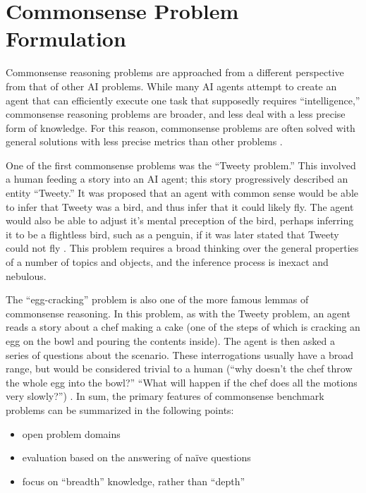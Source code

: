 \section{Commonsense Problem Formulation}
Commonsense reasoning problems are approached from a different perspective from that of other AI problems. While many AI agents attempt to create an agent that can efficiently execute one task that supposedly requires ``intelligence,'' commonsense reasoning problems are broader, and less deal with a less precise form of knowledge. For this reason, commonsense problems are often solved with general solutions with less precise metrics than other problems \cite{johnston2008comirit,johnston2009practical}.

One of the first commonsense problems was the ``Tweety problem.'' This involved a human feeding a story into an AI agent; this story progressively described an entity ``Tweety.'' It was proposed that an agent with common sense would be able to infer that Tweety was a bird, and thus infer that it could likely fly. The agent would also be able to adjust it's mental preception of the bird, perhaps inferring it to be a flightless bird, such as a penguin, if it was later stated that Tweety could not fly \cite{johnston2008comirit,egg-cracking}. This problem requires a broad thinking over the general properties of a number of topics and objects, and the inference process is inexact and nebulous.

The ``egg-cracking'' problem is also one of the more famous lemmas of commonsense reasoning. In this problem, as with the Tweety problem, an agent reads a story about a chef making a cake (one of the steps of which is cracking an egg on the bowl and pouring the contents inside). The agent is then asked a series of questions about the scenario. These interrogations usually have a broad range, but would be considered trivial to a human (``why doesn't the chef throw the whole egg into the bowl?'' ``What will happen if the chef does all the motions very slowly?'') \cite{egg-cracking}. In sum, the primary features of commonsense benchmark problems can be summarized in the following points:
\begin{center}
	\begin{itemize}
		\item open problem domains
		\item evaluation based on the answering of na\"{i}ve questions
		\item focus on ``breadth'' knowledge, rather than ``depth''
	\end{itemize}
\end{center}

